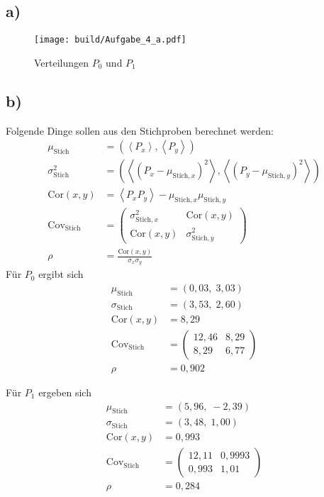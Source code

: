 \subsection{a)}
\begin{figure}
  \texttt{[image: build/Aufgabe\_4\_a.pdf]}
  \caption{Verteilungen $P_0$ und $P_1$}
  \label{fig:A4a}
\end{figure}


\subsection{b)}
Folgende Dinge sollen aus den Stichproben berechnet werden:
\begin{align}
  \mu_{\text{Stich}}         &=\left(\left\langle P_x\right\rangle,\left\langle P_y\right\rangle\right)\\
  \sigma_{\text{Stich}}^2    &=\left(\left\langle(P_x-\mu_{\text{Stich},x})^2\right\rangle,\left\langle(P_y-\mu_{\text{Stich},y})^2\right\rangle\right)\\
  \text{Cor}(x,y)            &=\left\langle P_xP_y\right\rangle-\mu_{\text{Stich},x}\mu_{\text{Stich},y}\\
  \text{Cov}_{\text{Stich}}  &=\left(
  \begin{array}{rr}
    \sigma_{\text{Stich},x}^2   & \text{Cor}(x,y)\\
    \text{Cor}(x,y)             & \sigma_{\text{Stich},y}^2
  \end{array}
                            \right)\\
  \rho                       &=\frac{\text{Cor}(x,y)}{\sigma_x\sigma_y}
\end{align}
Für $P_0$ ergibt sich
\begin{align}
  \mu_{\text{Stich}}         &=\left(0,03,\; 3,03\right)\\
  \sigma_{\text{Stich}}      &=\left(3,53, \; 2,60\right)\\
  \text{Cor}(x,y)            &=8,29\\
  \text{Cov}_{\text{Stich}}  &=\left(
  \begin{array}{rr}
    12,46   & 8,29\\
    8,29    & 6,77
  \end{array}
                            \right)\\
  \rho                       &=0,902
\end{align}

Für $P_1$ ergeben sich
\begin{align}
  \mu_{\text{Stich}}         &=\left(5,96,\;  -2,39\right)\\
  \sigma_{\text{Stich}}      &=\left(3,48,\;  1,00\right)\\
  \text{Cor}(x,y)            &=0,993\\
  \text{Cov}_{\text{Stich}}  &=\left(
  \begin{array}{rr}
    12,11   & 0,9993\\
    0,993    & 1,01
  \end{array}
                            \right)\\
  \rho                       &=0,284
\end{align}

